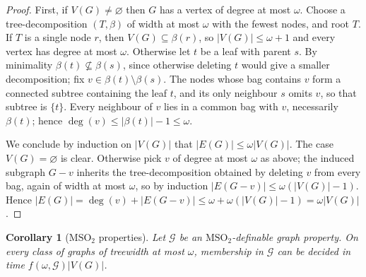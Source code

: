 \documentclass[11pt]{article}
\newtheorem{corollary}[theorem]{Corollary}
\theoremstyle{definition}
\newcommand{\MSOtwo}{\ensuremath{\mathrm{MSO}_2}}
\begin{document}
\begin{proof}
First, if \(V(G)\ne\varnothing\) then \(G\) has a vertex of degree at most
\(\omega\).  Choose a tree-decomposition \((T,\beta)\) of width at most \(\omega\)
with the fewest nodes, and root \(T\).  If \(T\) is a single node \(r\), then
\(V(G)\subseteq\beta(r)\), so \(|V(G)|\le\omega+1\) and every vertex has degree at
most \(\omega\).  Otherwise let \(t\) be a leaf with parent \(s\).  By minimality
\(\beta(t)\not\subseteq\beta(s)\), since otherwise deleting \(t\) would give a
smaller decomposition; fix \(v\in\beta(t)\setminus\beta(s)\).  The nodes whose bag
contains \(v\) form a connected subtree containing the leaf \(t\), and its only
neighbour \(s\) omits \(v\), so that subtree is \(\{t\}\).  Every neighbour of
\(v\) lies in a common bag with \(v\), necessarily \(\beta(t)\); hence
\(\deg(v)\le|\beta(t)|-1\le\omega\).

We conclude by induction on \(|V(G)|\) that \(|E(G)|\le\omega|V(G)|\).  The case
\(V(G)=\varnothing\) is clear.  Otherwise pick \(v\) of degree at most \(\omega\)
as above; the induced subgraph \(G-v\) inherits the tree-decomposition obtained by
deleting \(v\) from every bag, again of width at most \(\omega\), so by induction
\(|E(G-v)|\le\omega(|V(G)|-1)\).  Hence
\(|E(G)|=\deg(v)+|E(G-v)|\le\omega+\omega(|V(G)|-1)=\omega|V(G)|\).
\end{proof}

\begin{corollary}[\MSOtwo{} properties]
Let \(\mathcal G\) be an \MSOtwo{}-definable graph property.  On every class of
graphs of treewidth at most \(\omega\), membership in \(\mathcal G\) can be
decided in time \(f(\omega,\mathcal G)|V(G)|\).
\end{corollary}
\end{document}

